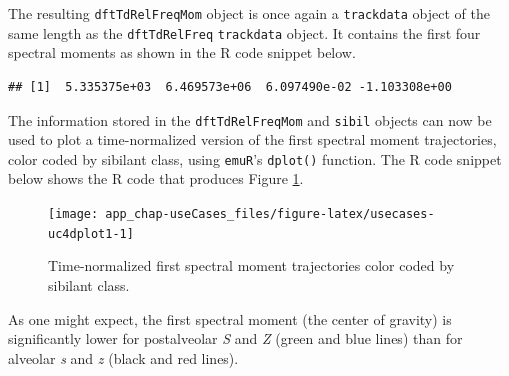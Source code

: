 \documentclass[]{book}
\newenvironment{Shaded}{\begin{snugshade}}{\end{snugshade}}
\newcommand{\CommentTok}[1]{\textcolor[rgb]{0.56,0.35,0.01}{\textit{#1}}}
\newcommand{\DataTypeTok}[1]{\textcolor[rgb]{0.13,0.29,0.53}{#1}}
\newcommand{\DecValTok}[1]{\textcolor[rgb]{0.00,0.00,0.81}{#1}}
\newcommand{\KeywordTok}[1]{\textcolor[rgb]{0.13,0.29,0.53}{\textbf{#1}}}
\newcommand{\NormalTok}[1]{#1}
\newcommand{\OperatorTok}[1]{\textcolor[rgb]{0.81,0.36,0.00}{\textbf{#1}}}
\newcommand{\OtherTok}[1]{\textcolor[rgb]{0.56,0.35,0.01}{#1}}
\newcommand{\StringTok}[1]{\textcolor[rgb]{0.31,0.60,0.02}{#1}}
\begin{document}
The resulting \texttt{dftTdRelFreqMom} object is once again a \texttt{trackdata} object of the same length as the \texttt{dftTdRelFreq} \texttt{trackdata} object. It contains the first four spectral moments as shown in the R code snippet below.

\begin{Shaded}
\end{Shaded}

\begin{verbatim}
## [1]  5.335375e+03  6.469573e+06  6.097490e-02 -1.103308e+00
\end{verbatim}

The information stored in the \texttt{dftTdRelFreqMom} and \texttt{sibil} objects can now be used to plot a time-normalized version of the first spectral moment trajectories, color coded by sibilant class, using \texttt{emuR}'s \texttt{dplot()} function. The R code snippet below shows the R code that produces Figure \ref{fig:usecases-uc4dplot1}.

\begin{Shaded}
\end{Shaded}

\begin{figure}

{\centering \texttt{[image: app\_chap-useCases\_files/figure-latex/usecases-uc4dplot1-1]} 

}

\caption{Time-normalized first spectral moment trajectories color coded by sibilant class.}\label{fig:usecases-uc4dplot1}
\end{figure}

As one might expect, the first spectral moment (the center of gravity) is significantly lower for postalveolar \emph{S} and \emph{Z} (green and blue lines) than for alveolar \emph{s} and \emph{z} (black and red lines).
\end{document}

